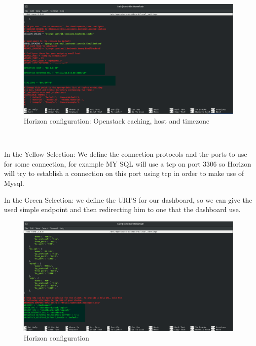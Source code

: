 \begin{spacing}{1.2}
\\
\begin{figure}[!htb] 
\begin{center} 
\includegraphics[width=1\linewidth]{Cloud/Configure Horizon/C_2_conf_3.png} 
\end{center} 
\caption{ Horizon configuration: Openstack caching, host and timezone} 
\end{figure} 
\FloatBarrier
\\
\par In the Yellow Selection: We define the connection protocols and the ports to use for some connection, for example MY SQL will use a tcp on port 3306 so Horizon will try to establish a connection on this port using tcp in order to make use of Mysql.

\par In the Green Selection: we define the URI'S for our dashboard, so we can give the used simple endpoint and then redirecting him to one that the dashboard use.
\\
\begin{figure}[!htb] 
\begin{center} 
\includegraphics[width=1\linewidth]{Cloud/Configure Horizon/C_2_conf_4.png} 
\end{center} 
\caption{ Horizon configuration} 
\end{figure} 
\FloatBarrier
\\


\end{spacing}
